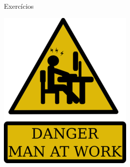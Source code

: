 \documentclass{beamer}
\begin{document}
\begin{frame}{Exercícios}
 \begin{center}
  \includegraphics[scale=0.8]{./figures/man_at_work.png}
 \end{center}
\end{frame}
















 
 
 
 
 
 
 
\end{document}
